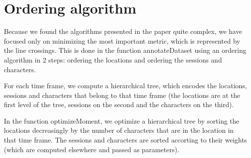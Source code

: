 \documentclass{report}
\begin{document}
\section{Ordering algorithm}
\par
Because we found the algorithms presented in the paper quite complex, we have focused only on minimizing the most important metric, which is represented by the line crossings. This is done in the function annotateDataset using an ordering algorithm in 2 steps: ordering the locations and ordering the sessions and characters.
\par For each time frame, we compute a hierarchical tree, which encodes the locations, sessions and characters that belong to that time frame (the locations are at the first level of the tree, sessions on the second and the characters on the third).
\par
In the function optimizeMoment, we optimize a hierarchical tree by sorting the locations decreasingly by the number of characters that are in the location in that time frame. The sessions and characters are sorted accorting to their weights (which are computed elsewhere and passed as parameters).
\par
\end{document}
